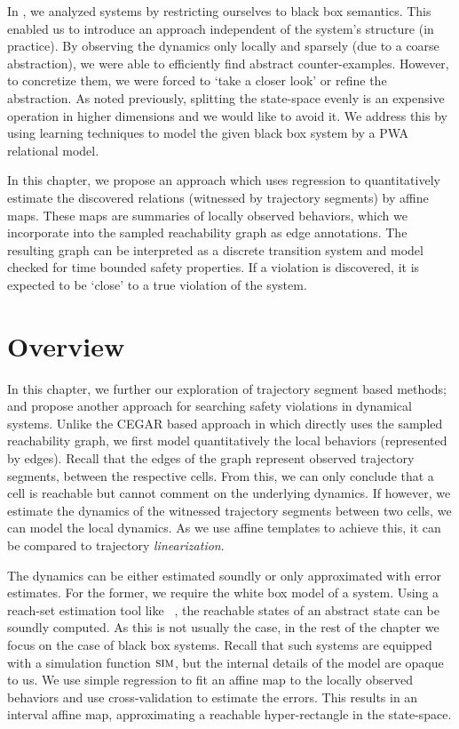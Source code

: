 
In , we analyzed systems by restricting ourselves to
black box semantics. This enabled us to introduce an approach
independent of the system's structure (in practice). By observing the
dynamics only locally and sparsely (due to a coarse abstraction), we
were able to efficiently find abstract counter-examples. However, to
concretize them, we were forced to `take a closer look' or refine the
abstraction. As noted previously, splitting the state-space evenly is
an expensive operation in higher dimensions and we would like to avoid
it. We address this by using learning techniques to model the given
black box system by a PWA relational model.

In this chapter, we propose an approach which uses regression to
quantitatively estimate the discovered relations (witnessed by
trajectory segments) by affine maps. These maps are summaries of
locally observed behaviors, which we incorporate into the sampled
reachability graph as edge annotations. The resulting graph can be
interpreted as a discrete transition system and model checked for
time bounded safety properties. If a violation is discovered, it is
expected to be `close' to a true violation of the system.

\section{Overview}

In this chapter, we further our exploration of trajectory segment
based methods; and propose another approach for searching safety
violations in dynamical systems. Unlike the CEGAR based approach in
 which directly uses the sampled reachability graph, we
first model quantitatively the local behaviors (represented by edges).
Recall that the edges of the graph represent observed trajectory
segments, between the respective cells. From this, we can only
conclude that a cell is reachable but cannot comment on the
underlying dynamics. If however, we estimate the dynamics of the
witnessed trajectory segments between two cells, we can model the
local dynamics. As we use affine templates to achieve this, it can be
compared to trajectory \textit{linearization}.

The dynamics can be either estimated soundly or only approximated with
error estimates. For the former, we require the white box model of a
system. Using a reach-set estimation tool like
\flowstar~\cite{chen2013flow}, the reachable states of an abstract
state can be soundly computed. As this is not usually the case, in the
rest of the chapter we focus on the case of black box systems.
Recall that such systems are equipped with a simulation function
$\mbox{\sc sim}$, but the internal details of the model are opaque to us.
We use simple regression to fit an affine map to the locally
observed behaviors and use cross-validation to estimate the errors.
This results in an interval affine map, approximating a reachable
hyper-rectangle in the state-space.

